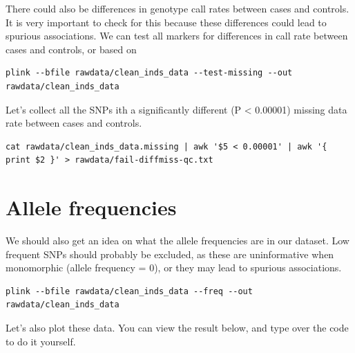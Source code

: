 \documentclass[
]{book}
\begin{document}
There could also be differences in genotype call rates between cases and controls. It is very important to check for this because these differences could lead to spurious associations. We can test all markers for differences in call rate between cases and controls, or based on

\begin{verbatim}
plink --bfile rawdata/clean_inds_data --test-missing --out rawdata/clean_inds_data
\end{verbatim}

Let's collect all the SNPs ith a significantly different (P \textless{} 0.00001) missing data rate between cases and controls.

\begin{verbatim}
cat rawdata/clean_inds_data.missing | awk '$5 < 0.00001' | awk '{ print $2 }' > rawdata/fail-diffmiss-qc.txt
\end{verbatim}

\hypertarget{allele-frequencies}{%
\section{Allele frequencies}\label{allele-frequencies}}

We should also get an idea on what the allele frequencies are in our dataset. Low frequent SNPs should probably be excluded, as these are uninformative when monomorphic (allele frequency = 0), or they may lead to spurious associations.

\begin{verbatim}
plink --bfile rawdata/clean_inds_data --freq --out rawdata/clean_inds_data
\end{verbatim}

Let's also plot these data. You can view the result below, and type over the code to do it yourself.
\end{document}
